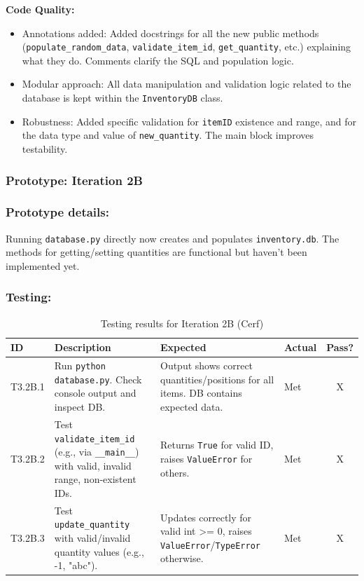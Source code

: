 \textbf{Code Quality:}
\begin{itemize}
	\item Annotations added: Added docstrings for all the new public methods (\verb|populate_random_data|, \verb|validate_item_id|, \verb|get_quantity|, etc.) explaining what they do. Comments clarify the SQL and population logic.
	\item Modular approach: All data manipulation and validation logic related to the database is kept within the \verb|InventoryDB| class.
	\item Robustness: Added specific validation for \verb|itemID| existence and range, and for the data type and value of \verb|new_quantity|. The main block improves testability.
\end{itemize}

\newpage
\subsubsection*{Prototype: Iteration 2B}

\newpage

\subsubsection{Prototype details:}
Running \verb|database.py| directly now creates and populates \verb|inventory.db|. The methods for getting/setting quantities are functional but haven't been implemented yet.

\subsubsection{Testing:}
\begin{table}[htbp]
	\centering
	\begin{tabularx}{\textwidth}{|l|X|p{4.5cm}|p{1.5cm}|c|}
		\hline
		\textbf{ID} & \textbf{Description} & \textbf{Expected} & \textbf{Actual} & \textbf{Pass?} \\
		\hline
		T3.2B.1 & Run \verb|python database.py|. Check console output and inspect DB. & Output shows correct quantities/positions for all items. DB contains expected data. & Met & X \\
		\hline
		T3.2B.2 & Test \verb|validate_item_id| (e.g., via \verb|__main__|) with valid, invalid range, non-existent IDs. & Returns \verb|True| for valid ID, raises \verb|ValueError| for others. & Met & X \\
		\hline
		T3.2B.3 & Test \verb|update_quantity| with valid/invalid quantity values (e.g., -1, "abc"). & Updates correctly for valid int >= 0, raises \verb|ValueError|/\verb|TypeError| otherwise. & Met & X \\
		\hline
	\end{tabularx}
	\caption{Testing results for Iteration 2B (Cerf)}
\end{table}

